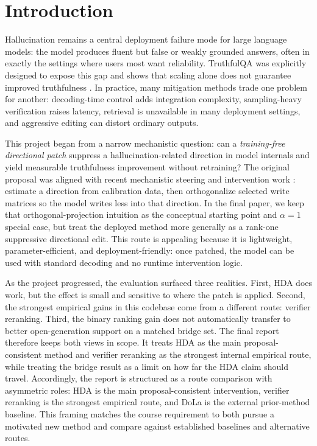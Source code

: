 \documentclass{article}
\begin{document}
\section{Introduction}
Hallucination remains a central deployment failure mode for large language models: the model produces fluent but false or weakly grounded answers, often in exactly the settings where users most want reliability. TruthfulQA was explicitly designed to expose this gap and shows that scaling alone does not guarantee improved truthfulness \citep{lin-etal-2022-truthfulqa}. In practice, many mitigation methods trade one problem for another: decoding-time control adds integration complexity, sampling-heavy verification raises latency, retrieval is unavailable in many deployment settings, and aggressive editing can distort ordinary outputs.

This project began from a narrow mechanistic question: can a \emph{training-free directional patch} suppress a hallucination-related direction in model internals and yield measurable truthfulness improvement without retraining? The original proposal was aligned with recent mechanistic steering and intervention work \citep{li2024iti,arditi2024refusal}: estimate a direction from calibration data, then orthogonalize selected write matrices so the model writes less into that direction. In the final paper, we keep that orthogonal-projection intuition as the conceptual starting point and $\alpha = 1$ special case, but treat the deployed method more generally as a rank-one suppressive directional edit. This route is appealing because it is lightweight, parameter-efficient, and deployment-friendly: once patched, the model can be used with standard decoding and no runtime intervention logic.

As the project progressed, the evaluation surfaced three realities. First, HDA does work, but the effect is small and sensitive to where the patch is applied. Second, the strongest empirical gains in this codebase come from a different route: verifier reranking. Third, the binary ranking gain does not automatically transfer to better open-generation support on a matched bridge set. The final report therefore keeps both views in scope. It treats HDA as the main proposal-consistent method and verifier reranking as the strongest internal empirical route, while treating the bridge result as a limit on how far the HDA claim should travel. Accordingly, the report is structured as a route comparison with asymmetric roles: HDA is the main proposal-consistent intervention, verifier reranking is the strongest empirical route, and DoLa is the external prior-method baseline. This framing matches the course requirement to both pursue a motivated new method and compare against established baselines and alternative routes.
\end{document}
